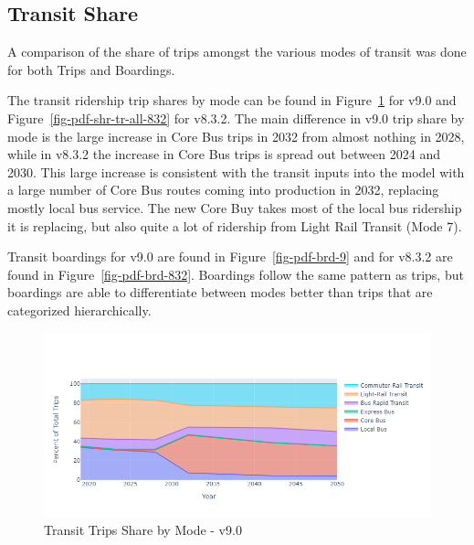 \documentclass[
  letterpaper,
  DIV=11,
  numbers=noendperiod,
  titlepage=false]{scrreprt}
\begin{document}
\hypertarget{transit-share}{%
\subsection{Transit Share}\label{transit-share}}

A comparison of the share of trips amongst the various modes of transit
was done for both Trips and Boardings.

The transit ridership trip shares by mode can be found in
Figure~\ref{fig-pdf-shr-tr-all-9} for v9.0 and
Figure~\ref{fig-pdf-shr-tr-all-832} for v8.3.2. The main difference in
v9.0 trip share by mode is the large increase in Core Bus trips in 2032
from almost nothing in 2028, while in v8.3.2 the increase in Core Bus
trips is spread out between 2024 and 2030. This large increase is
consistent with the transit inputs into the model with a large number of
Core Bus routes coming into production in 2032, replacing mostly local
bus service. The new Core Buy takes most of the local bus ridership it
is replacing, but also quite a lot of ridership from Light Rail Transit
(Mode 7).

Transit boardings for v9.0 are found in Figure~\ref{fig-pdf-brd-9} and
for v8.3.2 are found in Figure~\ref{fig-pdf-brd-832}. Boardings follow
the same pattern as trips, but boardings are able to differentiate
between modes better than trips that are categorized hierarchically.

\begin{figure}[H]

{\centering \includegraphics{v9x/v900/whats-new/_pictures/pdf-shr-tr-all-9.png}

}

\caption{\label{fig-pdf-shr-tr-all-9}Transit Trips Share by Mode - v9.0}

\end{figure}
\end{document}
